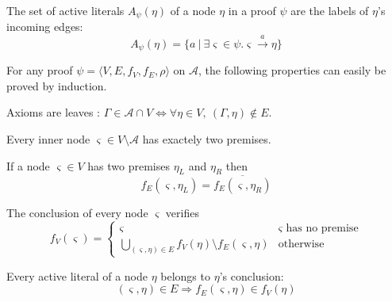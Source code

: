 \documentclass{llncs}
\begin{document}
\begin{definition}
The set of active literals $A_{\psi}(\eta)$ of a node $\eta$ in a proof $\psi$
are the labels of $\eta$'s incoming edges: 
$$
A_{\psi}(\eta) = \{a \ | \ \exists \varsigma \in \psi. \varsigma \xrightarrow{a} \eta \}
$$
\end{definition}

For any proof $\psi = \langle V,E,f_V,f_E,\rho \rangle$ on $\mathcal{A}$, the following properties
can easily be proved by induction.

\begin{property}
\label{prop:proof_leaf}
Axioms are leaves : $\Gamma \in \mathcal{A} \cap V \Leftrightarrow \forall \eta \in V ,~
(\Gamma,\eta) \notin E$.
\end{property}

\begin{property}
Every inner node $\varsigma \in V \setminus \mathcal{A}$ has exactely two premises.
\end{property}

\begin{property}
\label{prop:proof_edges}
If a node $\varsigma \in V$ has two premises $\eta_L$ and $\eta_R$ then
\begin{equation*}
f_E(\varsigma,\eta_L) = \overline{f_E(\varsigma,\eta_R)}
\end{equation*}
\end{property}

\begin{property}
\label{prop:proof_conclusion}
The conclusion of every node $\varsigma$ verifies
\begin{equation*}
  f_V(\varsigma) = \begin{cases}
    \varsigma & \varsigma \text{ has no premise} \\
    \bigcup_{(\varsigma,\eta) \in E}{f_V(\eta) \setminus f_E(\varsigma,\eta)} & \text{otherwise}
  \end{cases}
\end{equation*}
\end{property}

\begin{property}
Every active literal of a node $\eta$ belongs to $\eta$'s conclusion:
\begin{equation*}
  (\varsigma,\eta) \in E \Rightarrow f_E(\varsigma,\eta) \in f_V(\eta)
\end{equation*}
\end{property}
\end{document}

